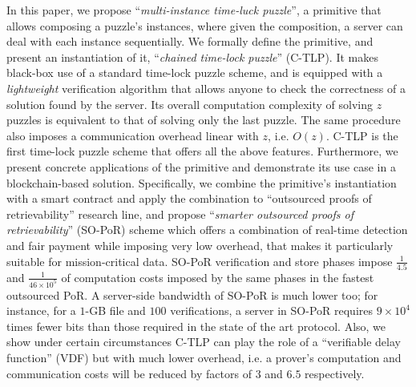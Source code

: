 In this paper, we propose  ``\emph{multi-instance time-luck puzzle}'', a primitive that allows composing a puzzle's instances, where given the composition, a server can deal with each instance sequentially. We formally define the primitive, and  present an instantiation of it,  ``\emph{chained  time-lock puzzle}'' (C-TLP).  It makes black-box use of a standard time-lock puzzle scheme, and is equipped  with a  \emph{lightweight} verification algorithm that allows anyone to check the correctness of a solution found by the server.    Its overall computation complexity of solving $z$ puzzles is  equivalent to that of solving only the last puzzle. The same procedure also imposes a  communication overhead linear with $z$, i.e. $O(z)$. C-TLP is the first time-lock puzzle scheme that offers all  the above features. Furthermore, we present  concrete applications of the primitive and demonstrate its use case in a blockchain-based solution. Specifically, we combine  the primitive's instantiation with a smart contract and apply the combination  to  ``outsourced proofs of  retrievability'' research line, and   propose ``\emph{smarter  outsourced proofs of retrievability}'' (SO-PoR) scheme which offers  a  combination of real-time detection and fair payment while  imposing very low overhead, that makes it particularly suitable for mission-critical data. SO-PoR verification and store phases impose $\frac{1}{4.5}$  and $\frac{1}{46\times 10^{\scriptscriptstyle 5}}$ of computation costs  imposed by the same phases in the fastest outsourced PoR. A server-side bandwidth of SO-PoR is much lower too;  for instance, for a $1$-GB file and $100$ verifications, a server in SO-PoR requires $9\times 10^{\scriptscriptstyle4}$ times fewer bits  than those required in the state of the art protocol.  Also, we show under certain circumstances  C-TLP can play the role of a ``verifiable delay function'' (VDF) but with much lower overhead, i.e. a prover's computation and communication costs will be reduced by factors of  $3$ and $6.5$ respectively.



